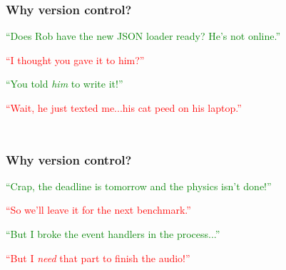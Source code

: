 \documentclass[glossy]{beamer}
\begin{document}
\begin{frame}[fragile=singleslide]
  \frametitle{Why version control?}

  \textcolor{green}{\enquote{Does Rob have the new JSON loader ready?  He's not online.}}
  \begin{flushright}
    \textcolor{red}{\enquote{I thought you gave it to him?}}
  \end{flushright}
  \textcolor{green}{\enquote{You told \emph{him} to write it!}}
  \begin{flushright}
    \textcolor{red}{\enquote{Wait, he just texted me...his cat peed on his laptop.}}
  \end{flushright}

  \begin{columns}[b]
    \begin{column}{6cm}
      \begin{figure}
        \centering
        
      \end{figure}
    \end{column}

    \begin{column}{6cm}
      \begin{figure}
        \centering
        
      \end{figure}
    \end{column}

  \end{columns}
\end{frame}

\begin{frame}[fragile=singleslide]
  \frametitle{Why version control?}

  \textcolor{green}{\enquote{Crap, the deadline is tomorrow and the physics isn't done!}}
  \begin{flushright}
    \textcolor{red}{\enquote{So we'll leave it for the next benchmark.}}
  \end{flushright}
  \textcolor{green}{\enquote{But I broke the event handlers in the process...}}
  \begin{flushright}
    \textcolor{red}{\enquote{But I \emph{need} that part to finish the audio!}}
  \end{flushright}

  \begin{columns}[b]
    \begin{column}{6cm}
      \begin{figure}
        \centering
        
      \end{figure}
    \end{column}

    \begin{column}{6cm}
      \begin{figure}
        \centering
        
      \end{figure}
    \end{column}

  \end{columns}
\end{frame}
\end{document}

